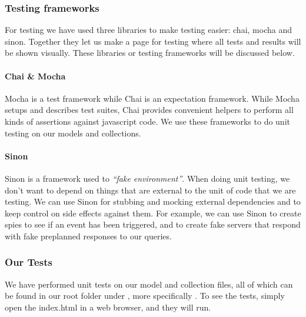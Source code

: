 \subsubsection{Testing frameworks}
For testing we have used three libraries to make testing easier: chai, mocha and sinon. Together they let us make a page for testing where all tests and results will be shown visually.
These libraries or testing frameworks will be discussed below.
\paragraph{Chai \& Mocha}
Mocha\cite{web_8} is a test framework while Chai\cite{web_7} is an expectation framework. While Mocha setups and describes test suites, Chai provides convenient helpers to perform all kinds of assertions against javascript code. We use these frameworks to do unit testing on our models and collections.

\paragraph{Sinon}
Sinon\cite{web_9} is a framework used to \textit{“fake environment”}. When doing unit testing, we don’t want to depend on things that are external to the unit of code that we are testing. We can use Sinon for stubbing and mocking external dependencies and to keep control on side effects against them. For example, we can use Sinon to create spies to see if an event has been triggered, and to create fake servers that respond with fake preplanned responses to our queries.
\subsubsection{Our Tests}
We have performed unit tests on our model and collection files, all of which can be found in our root folder under , more specifically . To see the tests, simply open the index.html in a web browser, and they will run.
